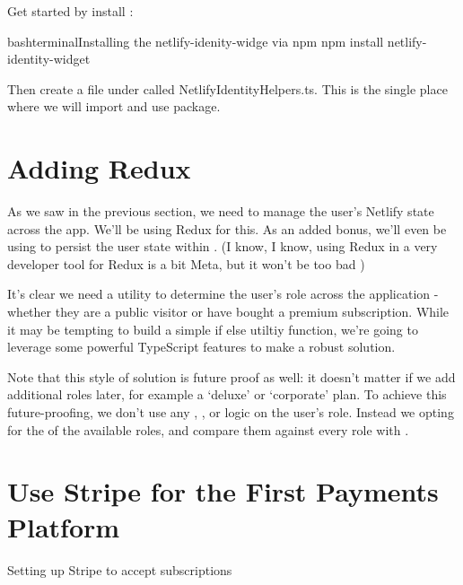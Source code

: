 \documentclass[paper=6in:9in,pagesize=pdftex,headinclude=on,footinclude=on,12pt]{scrbook}
\begin{document}

Get started by install :

\begin{codeInput}{bash}{terminal}{Installing the netlify-idenity-widge via npm}
npm install netlify-identity-widget
\end{codeInput}

Then create a file under  called NetlifyIdentityHelpers.ts. This is the single place where we will import and use  package.

\section{Adding Redux}

As we saw in the previous section, we need to manage the user's Netlify state across the app. We'll be using Redux for this. As an added bonus, we'll even be using  to persist the user state within . (I know, I know, using Redux in a very developer tool for Redux is a bit Meta, but it won't be too bad \wink)


It's clear we need a utility to determine the user's role across the application - whether they are a public visitor or have bought a premium subscription. While it may be tempting to build a simple if else utiltiy function, we're going to leverage some powerful TypeScript features to make a robust solution.

Note that this style of solution is future proof as well: it doesn't matter if we add additional roles later, for example a `deluxe' or `corporate' plan. To achieve this future-proofing, we don't use any , , or  logic on the user's role. Instead we opting for the  of the available roles, and compare them against every role with .

\section{Use Stripe for the First Payments Platform}
\begin{arrows}
\item Setting up Stripe to accept subscriptions
\end{arrows}
\end{document}
